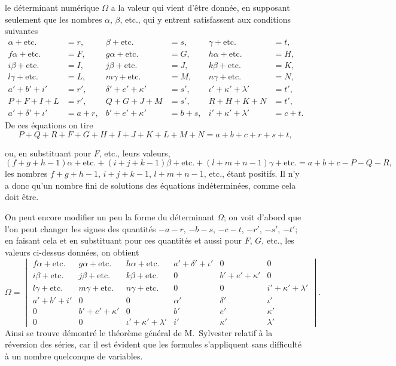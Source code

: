 \documentclass[11pt,a4paper]{article}
\begin{document}
le d\'eterminant num\'erique $\Omega$ a la valeur qui vient d'\^etre donn\'ee, en
supposant seulement que les nombres $\alpha$, $\beta$, etc., qui y entrent
satisfassent aux conditions suivantes
\begin{align*}
\alpha + \text{etc.} &= r, & \beta + \text{etc.} &= s, & \gamma + \text{etc.} &= t,\\
f\alpha + \text{etc.} &= F, & g\alpha + \text{etc.} &= G, & h\alpha + \text{etc.} &= H,\\
i\beta + \text{etc.} &= I, & j\beta + \text{etc.} &= J, & k\beta + \text{etc.} &= K,\\
l\gamma + \text{etc.} &= L, & m\gamma + \text{etc.} &= M, & n\gamma + \text{etc.} &= N,\\
a' + b' + i' &= r', & \delta' + e' + \kappa' &= s', & \iota' + \kappa' + \lambda' &= t',\\
P + F + I + L &= r', & Q + G + J + M &= s', & R + H + K + N &= t',\\
a' + \delta' + \iota' &= a + r, & b' + e' + \kappa' &= b + s, & i' + \kappa' + \lambda' &= c + t.
\end{align*}
De ces \'equations on tire
\[
P + Q + R + F + G + H + I + J + K + L + M + N = a + b + c + r + s + t,
\]

\setcounter{page}{59}

ou, en substituant pour $F$, etc., leurs valeurs,
\[
(f+g+h-1)\alpha + \text{etc.} + (i+j+k-1)\beta + \text{etc.} + (l+m+n-1)\gamma + \text{etc.}
= a + b + c - P - Q - R,
\]
les nombres $f+g+h-1$, $i+j+k-1$, $l+m+n-1$, etc., \'etant positifs. Il n'y a donc
qu'un nombre fini de solutions des \'equations ind\'etermin\'ees, comme cela doit
\^etre.

On peut encore modifier un peu la forme du d\'eterminant $\Omega$; on voit d'abord
que l'on peut changer les signes des quantit\'es $-a-r$, $-b-s$, $-c-t$, $-r'$,
$-s'$, $-t'$; en faisant cela et en substituant pour ces quantit\'es et aussi pour
$F$, $G$, etc., les valeurs ci-dessus donn\'ees, on obtient
\[
\Omega = \begin{vmatrix}
f\alpha+\text{etc.} & g\alpha+\text{etc.} & h\alpha+\text{etc.} & a'+\delta'+\iota' & 0 & 0 \\
i\beta+\text{etc.} & j\beta+\text{etc.} & k\beta+\text{etc.} & 0 & b'+e'+\kappa' & 0 \\
l\gamma+\text{etc.} & m\gamma+\text{etc.} & n\gamma+\text{etc.} & 0 & 0 & i'+\kappa'+\lambda' \\
a'+b'+i' & 0 & 0 & \alpha' & \delta' & \iota' \\
0 & b'+e'+\kappa' & 0 & b' & e' & \kappa' \\
0 & 0 & \iota'+\kappa'+\lambda' & i' & \kappa' & \lambda'
\end{vmatrix}.
\]
Ainsi se trouve d\'emontr\'e le th\'eor\`eme g\'en\'eral de M.~Sylvester relatif
\`a la r\'eversion des s\'eries, car il est \'evident que les formules s'appliquent
sans difficult\'e \`a un nombre quelconque de variables.
\end{document}
